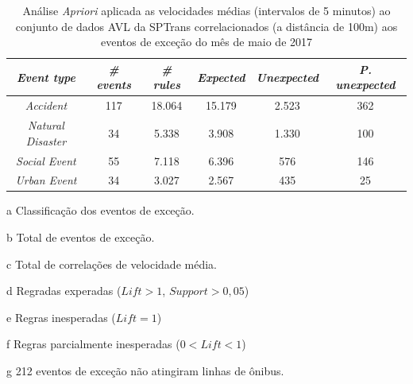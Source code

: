 \documentclass[
	12pt,				%
	oneside,			%
	a4paper,			%
	english,			%
	brazil				%
	]{abntex2ppgsi}
\begin{document}
{{\begin{apendicesenv}
\begin{table}[!htb]
\centering
\begin{threeparttable}
\caption {Análise \textit{Apriori} aplicada as velocidades médias (intervalos de 5 minutos) ao conjunto de dados AVL da SPTrans correlacionados (a distância de 100m) aos eventos de exceção do mês de maio de 2017}
\label {tab:aprioriFull}
\begin{tabular}{c|c|c|c|c|c}
\hline
\textbf{\textit{Event type}}\tnote{a} & \textbf{\textit{\# events}}\tnote{b} & \textit{\textbf{\# rules}}\tnote{c} & \textbf{\textit{Expected}}\tnote{d} & \textbf{\textit{Unexpected}}\tnote{e} & \textbf{\textit{P. unexpected}}\tnote{f}   \\
\hline
\textit{Accident} & 117 & 18.064 & 15.179 & 2.523 & 362 \\
\textit{Natural Disaster} & 34 & 5.338 & 3.908 & 1.330 & 100 \\
\textit{Social Event} & 55 & 7.118 & 6.396 & 576 & 146 \\
\textit{Urban Event} & 34 & 3.027 & 2.567 & 435 & 25 \\
\hline
\end{tabular}
\begin{tablenotes}
            \item[a] Classificação dos eventos de exceção.
            \item[b] Total de eventos de exceção.
            \item[c] Total de correlações de velocidade média.
            \item[d] Regradas experadas ($Lift > 1$, $Support > 0,05$)
            \item[e] Regras inesperadas ($Lift = 1$)
            \item[f] Regras parcialmente inesperadas ($0 < Lift < 1$)
            \item[g] 212 eventos de exceção não atingiram linhas de ônibus.
        \end{tablenotes}
\end{threeparttable}
\end{table}



\end{apendicesenv}}}
\end{document}
